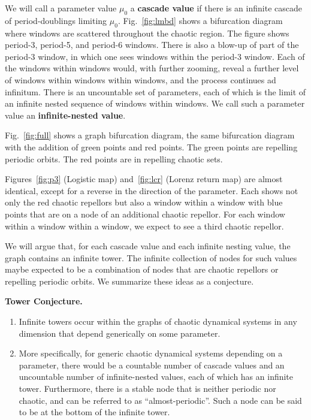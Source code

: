 \documentclass{article}
\newcommand{\jim}{\color{black} }
\begin{document}
{\jim We will call a parameter value $\mu_0$ a {\bf cascade value} if there is an infinite cascade of period-doublings limiting $\mu_0$. Fig.~\ref{fig:lmbd} shows a bifurcation diagram where windows are scattered throughout the chaotic region.
The figure shows period-3, period-5, and period-6 windows. There is also a blow-up of part of the period-3 window, in which one sees windows within the period-3 window.
Each of the windows within windows would, with further zooming, reveal a further level of windows within windows within windows, and the process continues ad infinitum.
There is an uncountable set of parameters, each of which is the limit of an infinite nested sequence of windows within windows. 
We call such a parameter value an {\bf infinite-nested value}.

Fig.~\ref{fig:full} shows a graph bifurcation diagram, the same bifurcation diagram with the addition of green points and red points. 
The green points are repelling periodic orbits.
The red points are in repelling chaotic sets.

Figures~\ref{fig:p3} (Logistic map)  and~\ref{fig:lcr} (Lorenz return map) are almost identical, except for a reverse in the direction of the parameter. 
Each shows not only the red chaotic repellors but also a window within a window with blue points that are on a node of an additional chaotic repellor. 
For each window within a window within a window, we expect to see a third chaotic repellor. 


We will argue that, for each cascade value and each infinite nesting value, the graph contains an infinite tower. 
The infinite collection of nodes for such values maybe expected to be a combination of nodes that are chaotic repellors or repelling periodic orbits. 
We summarize these ideas as a conjecture.
}

\smallskip
{\bf Tower Conjecture.} 
\begin{enumerate}
    \item Infinite towers occur within the graphs of chaotic dynamical systems in any dimension {\jim that depend generically on some parameter}.
    \item {\jim More specifically, for generic chaotic dynamical systems depending on a parameter, there would be a countable number of cascade values and an uncountable number of infinite-nested values, each of which has an infinite tower. 
    Furthermore, there is a stable node that is neither periodic nor chaotic, and can be referred to as ``almost-periodic''.
    Such a node can be said to be at the bottom of the infinite tower.
    }
\end{enumerate}
\smallskip
\end{document}
